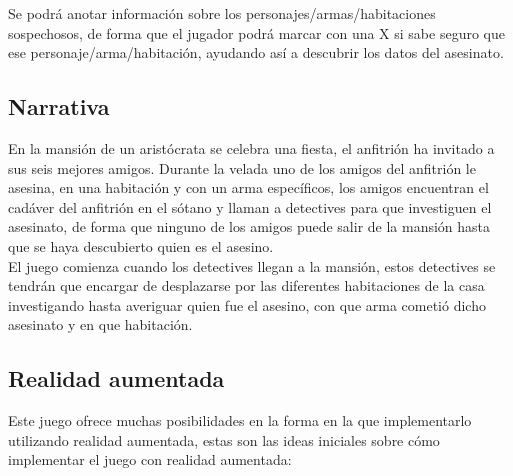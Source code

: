 Se podrá anotar información sobre los personajes/armas/habitaciones sospechosos, de forma que el jugador podrá marcar con una X si sabe seguro que ese personaje/arma/habitación, ayudando así a descubrir los datos del asesinato.

\subsection{Narrativa}
En la mansión de un aristócrata se celebra una fiesta, el anfitrión ha invitado a sus seis mejores amigos. Durante la velada uno de los amigos del anfitrión le asesina, en una habitación y con un arma específicos, los amigos encuentran el cadáver del anfitrión en el sótano y llaman a detectives para que investiguen el asesinato, de forma que ninguno de los amigos puede salir de la mansión hasta que se haya descubierto quien es el asesino.\\

El juego comienza cuando los detectives llegan a la mansión, estos detectives se tendrán que encargar de desplazarse por las diferentes habitaciones de la casa investigando hasta averiguar quien fue el asesino, con que arma cometió dicho asesinato y en que habitación.

\subsection{Realidad aumentada}
Este juego ofrece muchas posibilidades en la forma en la que implementarlo utilizando realidad aumentada, estas son las ideas iniciales sobre cómo implementar el juego con realidad aumentada:

